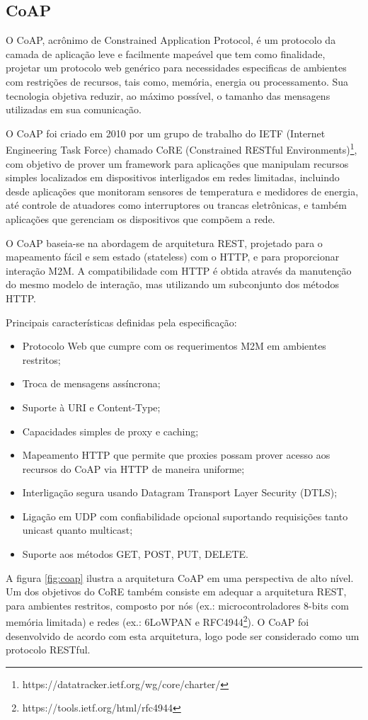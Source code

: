 \subsection{CoAP}

O CoAP, acrônimo de Constrained Application Protocol, é um protocolo
da camada de aplicação leve e facilmente mapeável que tem como finalidade,
projetar um protocolo web genérico para necessidades especificas de
ambientes com restrições de recursos, tais como, memória, energia
ou processamento. Sua tecnologia objetiva reduzir, ao máximo possível,
o tamanho das mensagens utilizadas em sua comunicação\cite{Shelby2014}. 

O CoAP foi criado em 2010 por um grupo de trabalho do IETF (Internet
Engineering Task Force) chamado CoRE (Constrained RESTful Environments)\footnote{https://datatracker.ietf.org/wg/core/charter/},
com objetivo de prover um framework para aplicações que manipulam
recursos simples localizados em dispositivos interligados em redes
limitadas, incluindo desde aplicações que monitoram sensores de temperatura
e medidores de energia, até controle de atuadores como interruptores
ou trancas eletrônicas, e também aplicações que gerenciam os dispositivos
que compõem a rede\cite{coap:ietf2016}.

O CoAP baseia-se na abordagem de arquitetura REST, projetado para
o mapeamento fácil e sem estado (stateless) com o HTTP, e para proporcionar
interação M2M. A compatibilidade com HTTP é obtida através da manutenção
do mesmo modelo de interação, mas utilizando um subconjunto dos métodos
HTTP\cite{Shelby2014}.

Principais características definidas pela especificação:
\begin{itemize}
\item Protocolo Web que cumpre com os requerimentos M2M em ambientes restritos;
\item Troca de mensagens assíncrona;
\item Suporte à URI e Content-Type;
\item Capacidades simples de proxy e caching;
\item Mapeamento HTTP que permite que proxies possam prover acesso aos recursos
do CoAP via HTTP de maneira uniforme;
\item Interligação segura usando Datagram Transport Layer Security (DTLS);
\item Ligação em UDP com confiabilidade opcional suportando requisições
tanto unicast quanto multicast;
\item Suporte aos métodos GET, POST, PUT, DELETE.
\end{itemize}
A figura \ref{fig:coap} ilustra a arquitetura CoAP em uma perspectiva
de alto nível. Um dos objetivos do CoRE também consiste em adequar
a arquitetura REST, para ambientes restritos, composto por nós (ex.:
microcontroladores 8-bits com memória limitada) e redes (ex.: 6LoWPAN
e RFC4944\footnote{https://tools.ietf.org/html/rfc4944}). O CoAP
foi desenvolvido de acordo com esta arquitetura, logo pode ser considerado
como um protocolo RESTful\cite{Shelby2014}.

